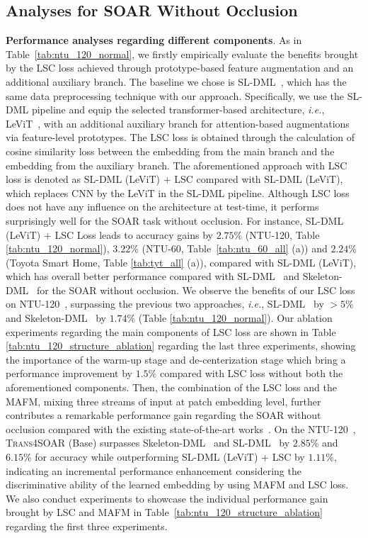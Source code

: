 \documentclass[lettersize,journal]{IEEEtran}
\newcommand{\mypar}[1]{\vspace{0.1cm}\noindent\textbf{#1}.}
\begin{document}
\subsection{Analyses for SOAR Without Occlusion}

\mypar{Performance analyses regarding different components}
As in Table~\ref{tab:ntu_120_normal}, we firstly empirically evaluate the benefits brought by the LSC loss achieved through prototype-based feature augmentation and an additional auxiliary branch.
The baseline we chose is SL-DML~\cite{memmesheimer2021sl}, which has the same data preprocessing technique with our approach.
Specifically, we use the SL-DML pipeline and equip the selected transformer-based architecture, \textit{i.e.}, LeViT~\cite{graham2021levit}, with an additional auxiliary branch for attention-based augmentations via feature-level prototypes. The LSC loss is obtained through the calculation of cosine similarity loss between the embedding from the main branch and the embedding from the auxiliary branch. The aforementioned approach with LSC loss is denoted as SL-DML (LeViT) + LSC compared with SL-DML (LeViT), which replaces CNN by the LeViT in the SL-DML pipeline.
Although LSC loss does not have any influence on the architecture at test-time, it performs surprisingly well for the SOAR task without occlusion. For instance, SL-DML (LeViT) + LSC Loss leads to accuracy gains by $2.75\%$ (NTU-120, Table \ref{tab:ntu_120_normal}), $3.22\%$ (NTU-60, Table~\ref{tab:ntu_60_all} (a)) and $2.24\%$ (Toyota Smart Home, Table \ref{tab:tyt_all} (a)), compared with SL-DML (LeViT), which has overall better performance compared with SL-DML~\cite{memmesheimer2021sl} and Skeleton-DML~\cite{memmesheimer2020skeleton_dml} for the SOAR without occlusion.
We observe the benefits of our LSC loss on NTU-120~\cite{liu2019ntu}, surpassing the previous two approaches, \textit{i.e.}, SL-DML~\cite{memmesheimer2021sl} by ${>}5\%$ and Skeleton-DML~\cite{memmesheimer2020skeleton_dml} by $1.74\%$ (Table \ref{tab:ntu_120_normal}). 
Our ablation experiments regarding the main components of LSC loss are shown in Table \ref{tab:ntu_120_structure_ablation} regarding the last three experiments, showing the importance of the warm-up stage and de-centerization stage which bring a performance improvement by $1.5\%$ compared with LSC loss without both the aforementioned components.
Then, the combination of the LSC loss and the MAFM, mixing three streams of input at patch embedding level, further contributes a remarkable performance gain regarding the SOAR without occlusion compared with the existing state-of-the-art works~\cite{memmesheimer2020skeleton_dml,memmesheimer2020skeleton_dml}. On the NTU-120~\cite{liu2019ntu}, \textsc{Trans4SOAR} (Base) surpasses Skeleton-DML~\cite{memmesheimer2020skeleton_dml} and SL-DML~\cite{memmesheimer2021sl} by $2.85\%$ and $6.15\%$ for accuracy while outperforming SL-DML (LeViT) + LSC by $1.11\%$, indicating an incremental performance enhancement considering the discriminative ability of the learned embedding by using MAFM and LSC loss. We also conduct experiments to showcase the individual performance gain brought by LSC and MAFM in Table~\ref{tab:ntu_120_structure_ablation} regarding the first three experiments.
\end{document}
